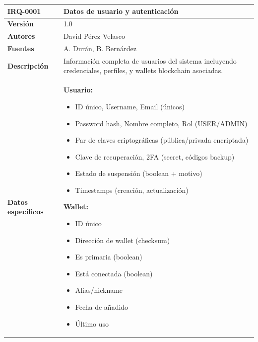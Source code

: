 \documentclass[11pt, a4paper]{article}
\begin{document}
\begin{table}[H]
    \centering
    \small
    \begin{tabular}{|p{4cm}|p{10cm}|}
    \hline
    \textbf{IRQ-0001} & Datos de usuario y autenticación \\
    \hline
    \textbf{Versión} & 1.0 \\
    \hline
    \textbf{Autores} & David Pérez Velasco \\
    \hline
    \textbf{Fuentes} & A. Durán, B. Bernárdez \\
    \hline
    \textbf{Descripción} & Información completa de usuarios del sistema incluyendo credenciales, perfiles, y wallets blockchain asociadas. \\
    \hline
    \textbf{Datos específicos} & 
    \textbf{Usuario:}
    \begin{itemize}
        \item ID único, Username, Email (únicos)
        \item Password hash, Nombre completo, Rol (USER/ADMIN)
        \item Par de claves criptográficas (pública/privada encriptada)
        \item Clave de recuperación, 2FA (secret, códigos backup)
        \item Estado de suspensión (boolean + motivo)
        \item Timestamps (creación, actualización)
    \end{itemize}
    
    \textbf{Wallet:}
    \begin{itemize}
        \item ID único
        \item Dirección de wallet (checksum)
        \item Es primaria (boolean)
        \item Está conectada (boolean)
        \item Alias/nickname
        \item Fecha de añadido
        \item Último uso
    \end{itemize}
    

\end{tabular}
\end{table}
\end{document}
